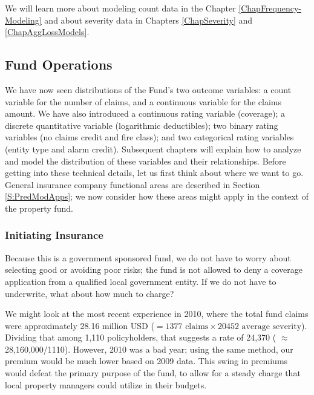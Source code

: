 \documentclass[
]{book}
\begin{document}
We will learn more about modeling count data in the Chapter \ref{ChapFrequency-Modeling} and about severity data in Chapters \ref{ChapSeverity} and \ref{ChapAggLossModels}.

\hypertarget{fund-operations}{%
\subsection{Fund Operations}\label{fund-operations}}

We have now seen distributions of the Fund's two outcome variables: a count variable for the number of claims, and a continuous variable for the claims amount. We have also introduced a continuous rating variable (coverage); a discrete quantitative variable (logarithmic deductibles); two binary rating variables (no claims credit and fire class); and two categorical rating variables (entity type and alarm credit). Subsequent chapters will
explain how to analyze and model the distribution of these variables and their relationships. Before getting into these technical details, let us
first think about where we want to go. General insurance company functional areas are described in Section \ref{S:PredModApps}; we now consider how these areas might apply in the context of the property fund.

\hypertarget{initiating-insurance-1}{%
\subsubsection*{Initiating Insurance}\label{initiating-insurance-1}}

Because this is a government sponsored fund, we do not have to worry
about selecting good or avoiding poor risks; the fund is not allowed to
deny a coverage application from a qualified local government entity. If
we do not have to underwrite, what about how much to charge?

We might look at the most recent experience in 2010, where the total
fund claims were approximately 28.16 million USD
(\(=1377 \text{ claims} \times 20452 \text{ average severity}\)). Dividing
that among 1,110 policyholders, that suggests a rate of 24,370 (
\(\approx\) 28,160,000/1110). However, 2010 was a bad year; using the same
method, our premium would be much lower based on 2009 data. This swing
in premiums would defeat the primary purpose of the fund, to allow for a
steady charge that local property managers could utilize in their
budgets.
\end{document}
